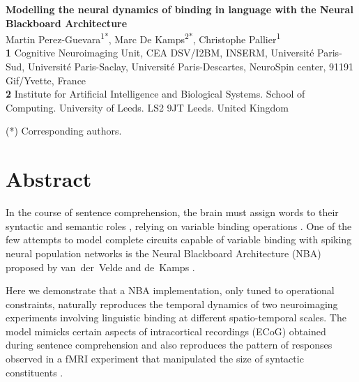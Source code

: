 \documentclass[10pt]{article}
\date{}
\begin{document}
\vspace*{0.2in}

\begin{flushleft} {\LARGE \textbf{Modelling the neural dynamics of
      binding in language with the Neural Blackboard Architecture} }
  \newline
  \\

  Martin Perez-Guevara\textsuperscript{1*}, Marc De Kamps\textsuperscript{2*}, Christophe Pallier\textsuperscript{1}
  \\
  \bigskip \textbf{1} Cognitive Neuroimaging Unit, CEA DSV/I2BM,
  INSERM, Université Paris-Sud, Université Paris-Saclay,
  Université Paris-Descartes, NeuroSpin center, 91191 Gif/Yvette, France
  \\
  \textbf{2} Institute for Artificial Intelligence and Biological
  Systems. School of Computing. University of Leeds. LS2 9JT Leeds.
  United Kingdom
  \\
  \bigskip


(*) Corresponding authors.
  
\end{flushleft}


\section*{Abstract}

In the course of sentence comprehension, the brain must assign words to their syntactic and semantic roles \cite{smolensky2006harmonic,Jackendoff_2002b}, relying on variable binding operations \cite{marcus14}.
One of the few attempts to model complete circuits capable of variable binding with spiking neural population networks is the Neural Blackboard Architecture (NBA) proposed by van~der~Velde and de~Kamps \cite{van_der_Velde_2006}.

Here we demonstrate that a NBA implementation, only tuned to operational constraints, naturally reproduces the temporal dynamics of two neuroimaging experiments involving linguistic binding at different spatio-temporal scales. 
The model mimicks certain aspects of intracortical recordings (ECoG) obtained during sentence comprehension \cite{Nelson_2017} and also reproduces the pattern of responses observed in a fMRI experiment that manipulated the size of syntactic constituents \cite{Pallier_2011}.
\end{document}
